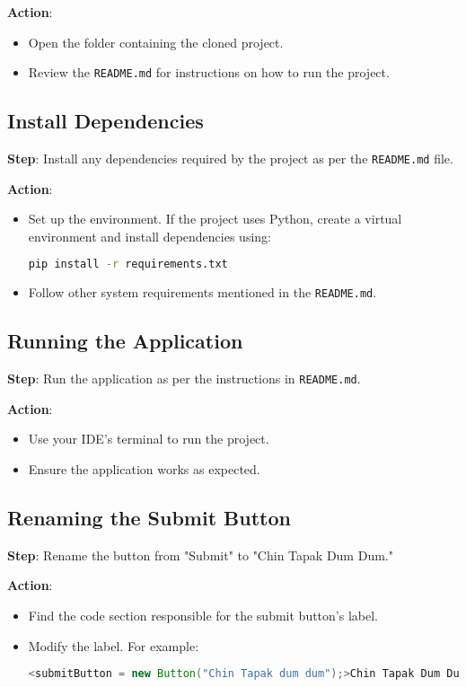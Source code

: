 \documentclass[a4paper,12pt]{article}
\begin{document}
\textbf{Action}:
\begin{itemize}
    \item Open the folder containing the cloned project.
    \item Review the \texttt{README.md} for instructions on how to run the project.
\end{itemize}

\subsection{Install Dependencies}
\textbf{Step}: Install any dependencies required by the project as per the \texttt{README.md} file.

\textbf{Action}:
\begin{itemize}
    \item Set up the environment. If the project uses Python, create a virtual environment and install dependencies using:
    \begin{lstlisting}[language=bash]
    pip install -r requirements.txt
    \end{lstlisting}
    \item Follow other system requirements mentioned in the \texttt{README.md}.
\end{itemize}

\subsection{Running the Application}
\textbf{Step}: Run the application as per the instructions in \texttt{README.md}.

\textbf{Action}:
\begin{itemize}
    \item Use your IDE's terminal to run the project.
    \item Ensure the application works as expected.
\end{itemize}
\newpage
\subsection{Renaming the Submit Button}
\textbf{Step}: Rename the button from "Submit" to "Chin Tapak Dum Dum."

\textbf{Action}:
\begin{itemize}
    \item Find the code section responsible for the submit button's label.
    \item Modify the label. For example:
    \begin{lstlisting}[language=JAVA]
    <submitButton = new Button("Chin Tapak dum dum");>Chin Tapak Dum Dum</button>
    \end{lstlisting}
\end{itemize}
\end{document}
